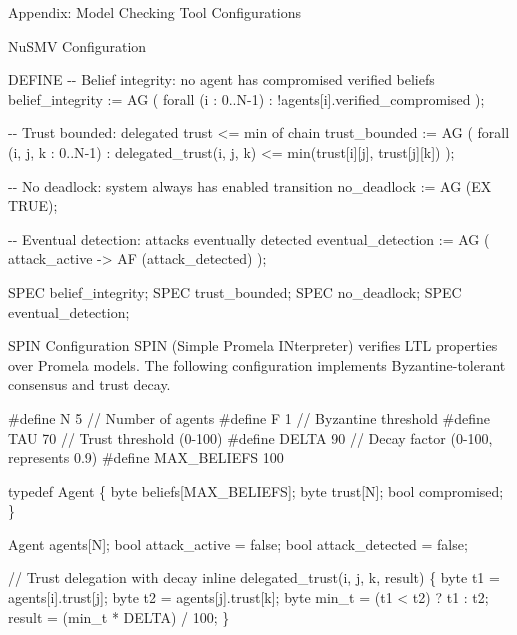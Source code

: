 \documentclass[
  ignorenonframetext,
]{beamer}
\newenvironment{Shaded}{}{}
\newcommand{\NormalTok}[1]{#1}
\begin{document}
\begin{frame}[fragile]{Appendix: Model Checking Tool Configurations}
\begin{block}{NuSMV Configuration}
\begin{Shaded}
\begin{Highlighting}[]
\NormalTok{DEFINE}
\NormalTok{  {-}{-} Belief integrity: no agent has compromised verified beliefs}
\NormalTok{  belief\_integrity := AG (}
\NormalTok{    forall (i : 0..N{-}1) :}
\NormalTok{      !agents[i].verified\_compromised}
\NormalTok{  );}

\NormalTok{  {-}{-} Trust bounded: delegated trust \textless{}= min of chain}
\NormalTok{  trust\_bounded := AG (}
\NormalTok{    forall (i, j, k : 0..N{-}1) :}
\NormalTok{      delegated\_trust(i, j, k) \textless{}= min(trust[i][j], trust[j][k])}
\NormalTok{  );}

\NormalTok{  {-}{-} No deadlock: system always has enabled transition}
\NormalTok{  no\_deadlock := AG (EX TRUE);}

\NormalTok{  {-}{-} Eventual detection: attacks eventually detected}
\NormalTok{  eventual\_detection := AG (}
\NormalTok{    attack\_active {-}\textgreater{} AF (attack\_detected)}
\NormalTok{  );}

\NormalTok{SPEC belief\_integrity;}
\NormalTok{SPEC trust\_bounded;}
\NormalTok{SPEC no\_deadlock;}
\NormalTok{SPEC eventual\_detection;}
\end{Highlighting}
\end{Shaded}
\end{block}

\begin{block}{SPIN Configuration}
\protect{}\label{sec:spin-config}
SPIN (Simple Promela INterpreter) verifies LTL properties over Promela
models. The following configuration implements Byzantine-tolerant
consensus and trust decay.

\begin{Shaded}
\begin{Highlighting}[]
\NormalTok{\#define N 5           // Number of agents}
\NormalTok{\#define F 1           // Byzantine threshold}
\NormalTok{\#define TAU 70        // Trust threshold (0{-}100)}
\NormalTok{\#define DELTA 90      // Decay factor (0{-}100, represents 0.9)}
\NormalTok{\#define MAX\_BELIEFS 100}

\NormalTok{typedef Agent \{}
\NormalTok{  byte beliefs[MAX\_BELIEFS];}
\NormalTok{  byte trust[N];}
\NormalTok{  bool compromised;}
\NormalTok{\}}

\NormalTok{Agent agents[N];}
\NormalTok{bool attack\_active = false;}
\NormalTok{bool attack\_detected = false;}

\NormalTok{// Trust delegation with decay}
\NormalTok{inline delegated\_trust(i, j, k, result) \{}
\NormalTok{  byte t1 = agents[i].trust[j];}
\NormalTok{  byte t2 = agents[j].trust[k];}
\NormalTok{  byte min\_t = (t1 \textless{} t2) ? t1 : t2;}
\NormalTok{  result = (min\_t * DELTA) / 100;}
\NormalTok{\}}


\end{Highlighting}
\end{Shaded}
\end{block}
\end{frame}
\end{document}
